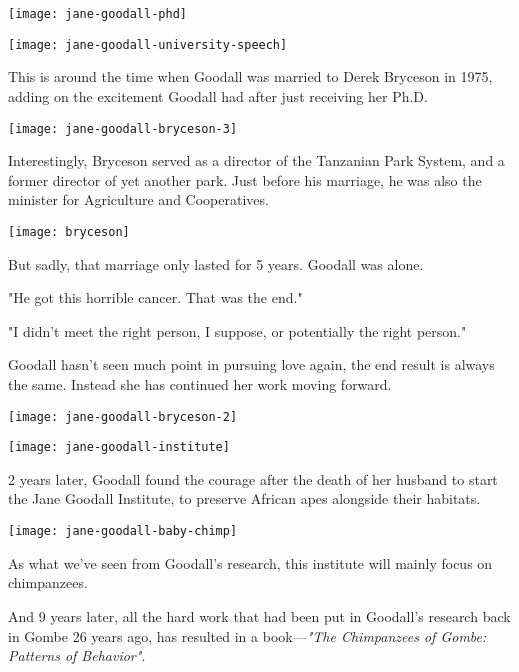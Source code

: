 \documentclass[12pt]{report}
\begin{document}
\texttt{[image: jane-goodall-phd]}

\texttt{[image: jane-goodall-university-speech]}

\pagebreak

This is around the time when Goodall was married to Derek Bryceson in 1975,
adding on the excitement Goodall had after just receiving her Ph.D.

\texttt{[image: jane-goodall-bryceson-3]}

Interestingly, Bryceson served as a director of the Tanzanian Park System, and
a former director of yet another park. Just before his marriage, he was also
the minister for Agriculture and Cooperatives.

\texttt{[image: bryceson]}

\pagebreak

But sadly, that marriage only lasted for 5 years. Goodall was alone.

"He got this horrible cancer. That was the end."

"I didn't meet the right person, I suppose, or potentially the right person."

Goodall hasn't seen much point in pursuing love again, the end result is always
the same. Instead she has continued her work moving forward.

\texttt{[image: jane-goodall-bryceson-2]}

\pagebreak

\texttt{[image: jane-goodall-institute]}

2 years later, Goodall found the courage after the death of her husband to
start the Jane Goodall Institute, to preserve African apes alongside their
habitats.

\texttt{[image: jane-goodall-baby-chimp]}

As what we've seen from Goodall's research, this institute will mainly focus on
chimpanzees.

\pagebreak

And 9 years later, all the hard work that had been put in Goodall's research
back in Gombe 26 years ago, has resulted in a book---\textit{"The Chimpanzees
of Gombe: Patterns of Behavior"}.
\end{document}
